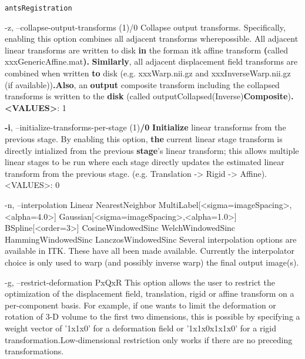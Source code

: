 \documentclass[ignorenonframetext,]{beamer}
\newenvironment{Shaded}{\begin{snugshade}}{\end{snugshade}}
\newcommand{\KeywordTok}[1]{\textcolor[rgb]{0.13,0.29,0.53}{\textbf{{#1}}}}
\newcommand{\StringTok}[1]{\textcolor[rgb]{0.31,0.60,0.02}{{#1}}}
\newcommand{\NormalTok}[1]{{#1}}
\begin{document}
\begin{frame}[fragile]{\texttt{antsRegistration}}
\begin{Shaded}
\begin{Highlighting}[]
     \NormalTok{-z, --collapse-output-transforms (1)/0}
          \NormalTok{Collapse output transforms. Specifically, enabling this option combines all}
          \NormalTok{adjacent transforms wherepossible. All adjacent linear transforms are written to}
          \NormalTok{disk}\KeywordTok{ in} \NormalTok{the forman itk affine transform }\KeywordTok{(}\NormalTok{called xxxGenericAffine.mat}\KeywordTok{).}
          \KeywordTok{Similarly}\NormalTok{, all adjacent displacement field transforms are combined when written}
          \KeywordTok{to} \NormalTok{disk (e.g. xxxWarp.nii.gz and xxxInverseWarp.nii.gz (if available))}\KeywordTok{.Also}\NormalTok{, an}
          \KeywordTok{output} \NormalTok{composite transform including the collapsed transforms is written to the}
          \KeywordTok{disk} \NormalTok{(called outputCollapsed(Inverse)}\KeywordTok{Composite}\NormalTok{)}\KeywordTok{.}
          \KeywordTok{<VALUES>}\NormalTok{: 1}

     \KeywordTok{-i}\NormalTok{, --initialize-transforms-per-stage (1)}\KeywordTok{/0}
          \KeywordTok{Initialize} \NormalTok{linear transforms from the previous stage. By enabling this option,}
          \KeywordTok{the} \NormalTok{current linear stage transform is directly intialized from the previous}
          \KeywordTok{stage}\StringTok{'s linear transform; this allows multiple linear stages to be run where}
\StringTok{          each stage directly updates the estimated linear transform from the previous}
\StringTok{          stage. (e.g. Translation -> Rigid -> Affine).}
\StringTok{          <VALUES>: 0}

\StringTok{     -n, --interpolation Linear}
\StringTok{                         NearestNeighbor}
\StringTok{                         MultiLabel[<sigma=imageSpacing>,<alpha=4.0>]}
\StringTok{                         Gaussian[<sigma=imageSpacing>,<alpha=1.0>]}
\StringTok{                         BSpline[<order=3>]}
\StringTok{                         CosineWindowedSinc}
\StringTok{                         WelchWindowedSinc}
\StringTok{                         HammingWindowedSinc}
\StringTok{                         LanczosWindowedSinc}
\StringTok{          Several interpolation options are available in ITK. These have all been made}
\StringTok{          available. Currently the interpolator choice is only used to warp (and possibly}
\StringTok{          inverse warp) the final output image(s).}

\StringTok{     -g, --restrict-deformation PxQxR}
\StringTok{          This option allows the user to restrict the optimization of the displacement}
\StringTok{          field, translation, rigid or affine transform on a per-component basis. For}
\StringTok{          example, if one wants to limit the deformation or rotation of 3-D volume to the}
\StringTok{          first two dimensions, this is possible by specifying a weight vector of '}\NormalTok{1x1x0}\StringTok{'}
\StringTok{          for a deformation field or '}\NormalTok{1x1x0x1x1x0}\StringTok{' for a rigid}
\StringTok{          transformation.Low-dimensional restriction only works if there are no preceding}
\StringTok{          transformations.}


\end{Highlighting}
\end{Shaded}
\end{frame}
\end{document}
